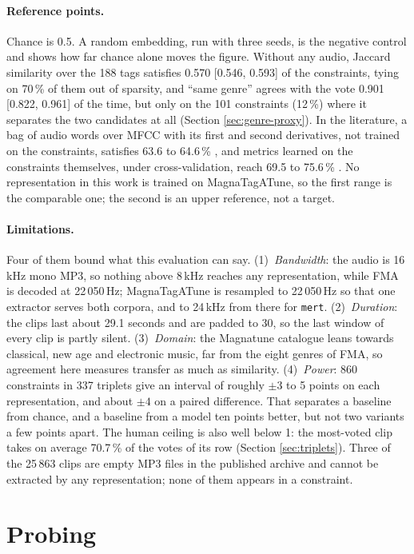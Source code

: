 \paragraph{Reference points.} Chance is 0.5. A random embedding, run with
three seeds, is the negative control and shows how far chance alone moves the
figure. Without any audio, Jaccard similarity over the 188 tags satisfies
0.570 [0.546, 0.593] of the constraints, tying on 70\,\% of them out of
sparsity, and ``same genre'' agrees with the vote 0.901 [0.822, 0.961] of the
time, but only on the 101 constraints (12\,\%) where it separates the two
candidates at all (Section \ref{sec:genre-proxy}). In the literature, a bag of
audio words over MFCC with its first and second derivatives, not trained on
the constraints, satisfies 63.6 to 64.6\,\% \cite{Karamanolakis2016}, and
metrics learned on the constraints themselves, under cross-validation, reach
69.5 to 75.6\,\% \cite{Wolff2012}. No representation in this work is trained
on MagnaTagATune, so the first range is the comparable one; the second is an
upper reference, not a target.

\paragraph{Limitations.} Four of them bound what this evaluation can say.
(1)~\emph{Bandwidth}: the audio is 16\,kHz mono MP3, so nothing above 8\,kHz
reaches any representation, while FMA is decoded at 22\,050\,Hz; MagnaTagATune
is resampled to 22\,050\,Hz so that one extractor serves both corpora, and to
24\,kHz from there for \texttt{mert}. (2)~\emph{Duration}: the clips last
about 29.1 seconds and are padded to 30, so the last window of every clip is
partly silent. (3)~\emph{Domain}: the Magnatune catalogue leans towards
classical, new age and electronic music, far from the eight genres of FMA, so
agreement here measures transfer as much as similarity. (4)~\emph{Power}: 860
constraints in 337 triplets give an interval of roughly $\pm 3$ to 5 points on
each representation, and about $\pm 4$ on a paired difference. That separates
a baseline from chance, and a baseline from a model ten points better, but not
two variants a few points apart. The human ceiling is also well below 1: the
most-voted clip takes on average 70.7\,\% of the votes of its row
(Section \ref{sec:triplets}). Three of the 25\,863 clips are empty MP3 files in
the published archive and cannot be extracted by any representation; none of
them appears in a constraint.

\section{Probing}
\label{sec:probing-protocol}

